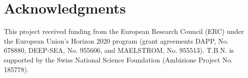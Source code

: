 \section*{Acknowledgments}

This project received funding from the European Research Council (ERC) under the
European Union’s Horizon 2020 program (grant agreements DAPP, No. 678880,
DEEP-SEA, No. 955606, and MAELSTROM, No. 955513). T.B.N. is supported by the
Swiss National Science Foundation (Ambizione Project No. 185778).
